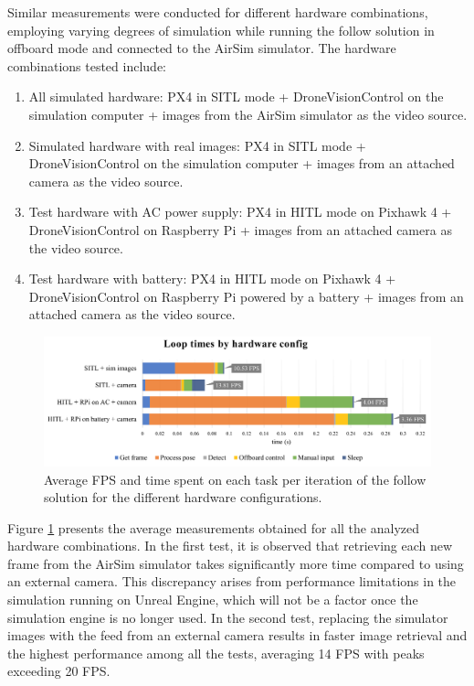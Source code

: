 Similar measurements were conducted for different hardware combinations, employing varying degrees of simulation while running the follow solution in offboard mode and connected to the AirSim simulator. The hardware combinations tested include:
\begin{enumerate}
    \item All simulated hardware: PX4 in SITL mode + DroneVisionControl on the simulation computer + images from the AirSim simulator as the video source.
    \item Simulated hardware with real images: PX4 in SITL mode + DroneVisionControl on the simulation computer + images from an attached camera as the video source.
    \item Test hardware with AC power supply: PX4 in HITL mode on Pixhawk 4 + DroneVisionControl on Raspberry Pi + images from an attached camera as the video source.
    \item Test hardware with battery: PX4 in HITL mode on Pixhawk 4 + DroneVisionControl on Raspberry Pi powered by a battery + images from an attached camera as the video source.
\end{enumerate}


\begin{figure}
  \centering
  \includegraphics[width=\textwidth, keepaspectratio]{img/performance-graph.png}
  \caption{Average FPS and time spent on each task per iteration of the follow solution for the different hardware configurations.}
  \label{fig:perf-analysis}
\end{figure}


Figure \ref{fig:perf-analysis} presents the average measurements obtained for all the analyzed hardware combinations. In the first test, it is observed that retrieving each new frame from the AirSim simulator takes significantly more time compared to using an external camera. This discrepancy arises from performance limitations in the simulation running on Unreal Engine, which will not be a factor once the simulation engine is no longer used. In the second test, replacing the simulator images with the feed from an external camera results in faster image retrieval and the highest performance among all the tests, averaging 14 FPS with peaks exceeding 20 FPS.

